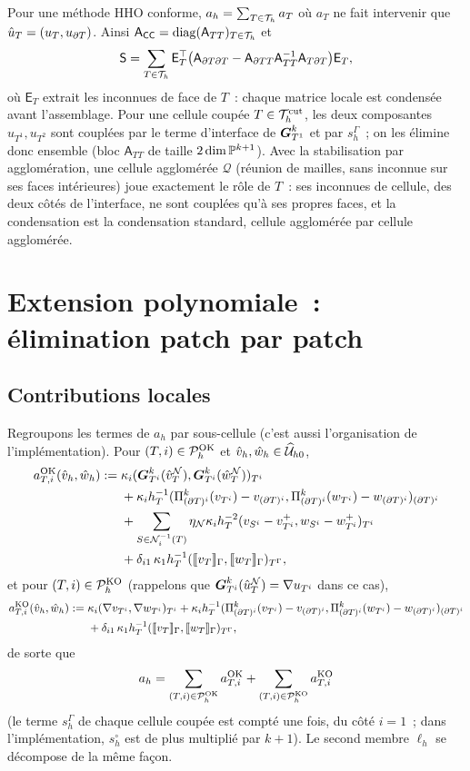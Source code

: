 \documentclass[11pt,a4paper]{article}
\theoremstyle{definition}
\theoremstyle{remark}
\newcommand{\patch}{\mathcal{Q}}
\newcommand{\A}{\mathsf{A}}
\newcommand{\Sm}{\mathsf{S}}
\begin{document}
Pour une méthode HHO conforme, $a_h=\sum_{T\in\mesh} a_T$ où $a_T$ ne fait intervenir que
$\uThat=(\uT,\ufT)$. Ainsi $\A_{\mathsf{CC}}=\operatorname{diag}(\A_{TT})_{T\in\mesh}$ et
\[
\Sm=\sum_{T\in\mesh} \mathsf{E}_T^\top\big(\A_{\partial T\partial T}-\A_{\partial T T}\A_{TT}^{-1}\A_{T\partial T}\big)\mathsf{E}_T ,
\]
où $\mathsf{E}_T$ extrait les inconnues de face de $T$~: chaque matrice locale est condensée avant
l'assemblage. Pour une cellule coupée $T\in\cutmesh$, les deux composantes $u_{T^1},u_{T^2}$ sont couplées
par le terme d'interface de $\GTo$ et par $s_h^\Gamma$~; on les élimine donc ensemble (bloc
$\A_{TT}$ de taille $2\dim\P^{k+1}$). Avec la stabilisation par agglomération, une cellule agglomérée
$\patch$ (réunion de mailles, sans inconnue sur ses faces intérieures) joue exactement le rôle de $T$~:
ses inconnues de cellule, des deux côtés de l'interface, ne sont couplées qu'à ses propres faces,
et la condensation est la condensation standard, cellule agglomérée par cellule agglomérée.

\section{Extension polynomiale~: élimination patch par patch}

\subsection{Contributions locales}

Regroupons les termes de $a_h$ par sous-cellule (c'est aussi l'organisation de l'implémentation).
Pour $(T,i)\in\pmeshOK$ et $\vhat,\what\in\Uhatz$,
\begin{align}
a^{\textup{OK}}_{T,i}(\vhat,\what) :={}& \kappa_i(\GTi(\vThatplus),\GTi(\wThatplus))_{T^i} \nonumber\\
&+ \kappa_i h_T^{-1}(\projT(\vTi)-\vdTi,\projT(\wTi)-\wdTi)_{\dTi} \nonumber\\
&+ \sumexi \eta_\N\kappa_i h_T^{-2}(\vSi-\vTi^+,\wSi-\wTi^+)_{T^i} \nonumber\\
&+ \delta_{i1}\,\kappa_1h_T^{-1}(\jumpvT_\Gamma,\jumpwT_\Gamma)_{\TG}, \label{eq:aOK}
\end{align}
et pour $(T,i)\in\pmeshKO$ (rappelons que $\GTi(\uThatplus)=\nabla\uTi$ dans ce cas),
\begin{align}
a^{\textup{KO}}_{T,i}(\vhat,\what) :={}& \kappa_i(\nabla\vTi,\nabla\wTi)_{T^i}
+ \kappa_i h_T^{-1}(\projT(\vTi)-\vdTi,\projT(\wTi)-\wdTi)_{\dTi} \nonumber\\
&+ \delta_{i1}\,\kappa_1h_T^{-1}(\jumpvT_\Gamma,\jumpwT_\Gamma)_{\TG}, \label{eq:aKO}
\end{align}
de sorte que
\[
a_h=\sum_{(T,i)\in\pmeshOK} a^{\textup{OK}}_{T,i}+\sum_{(T,i)\in\pmeshKO} a^{\textup{KO}}_{T,i}
\]
(le terme $s_h^\Gamma$ de chaque cellule coupée est compté une fois, du côté $i=1$~; dans
l'implémentation, $s_h^\circ$ est de plus multiplié par $k+1$). Le second membre $\ell_h$ se
décompose de la même façon.
\end{document}
